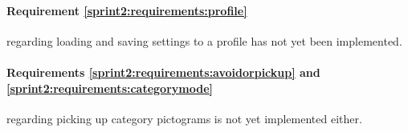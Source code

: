 \paragraph{Requirement \ref{sprint2:requirements:profile}} regarding loading and saving settings to a profile has not yet been implemented.

\paragraph{Requirements \ref{sprint2:requirements:avoidorpickup} and \ref{sprint2:requirements:categorymode}} regarding picking up category pictograms is not yet implemented either.